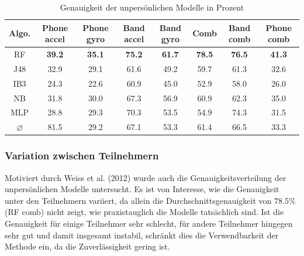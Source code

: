 \begin{table}
\centering
\footnotesize
\begin{tabular}{|c|c|c|c|c|c|c|c|}
	\hline 
	\textbf{Algo.} & \textbf{Phone accel} & \textbf{Phone gyro} & \textbf{Band accel} & \textbf{Band gyro} & \textbf{Comb} & \textbf{Band comb} & \textbf{Phone comb} \\ 
	\hline 
	RF & \textbf{39.2} & \textbf{35.1} & \textbf{75.2} & \textbf{61.7} & \textbf{78.5} & \textbf{76.5} & \textbf{41.3} \\ 
	J48 & 32.9 & 29.1 & 61.6 & 49.2 & 59.7 & 61.3 & 32.6 \\ 
	IB3 & 24.3 & 22.6 & 60.9 & 45.0 & 52.9 & 58.0 & 26.0 \\ 
	NB & 31.8 & 30.0 & 67.3 & 56.9 & 60.9 & 62.3 & 35.0 \\ 
	MLP & 28.8 & 29.3 & 70.3 & 53.5 & 54.9 & 74.3 & 31.5 \\ 
	\hline 
	$\varnothing$ & 81.5 & 29.2 & 67.1 & 53.3 & 61.4 & 66.5 & 33.3 \\ 
	\hline 
\end{tabular} 
\caption{Genauigkeit der unpersönlichen Modelle in Prozent}
\label{tab:accuracy-impersonal}
\end{table}

\subsubsection{Variation zwischen Teilnehmern}
Motiviert durch Weiss et al. (2012) \cite{Weiss2012} wurde auch die Genauigkeitsverteilung der unpersönlichen Modelle untersucht. Es ist von Interesse, wie die Genauigkeit unter den Teilnehmern variiert, da allein die Durchschnittsgenauigkeit von $78.5 \%$ (RF comb) nicht zeigt, wie praxistauglich die Modelle tatsächlich sind. Ist die Genauigkeit für einige Teilnehmer sehr schlecht, für andere Teilnehmer hingegen sehr gut und damit insgesamt instabil, schränkt dies die Verwendbarkeit der Methode ein, da die Zuverlässigkeit gering ist.

